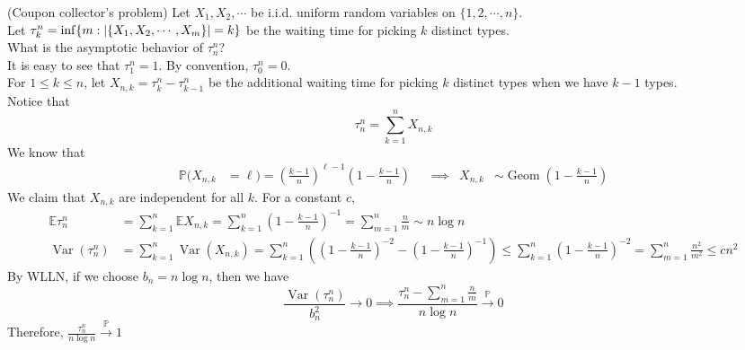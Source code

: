 \documentclass{huhtakm-template-book}
\newcommand{\prob}{\mathbb{P}}
\newcommand{\expect}{\mathbb{E}}
\DeclareMathOperator{\Geom}{Geom}
\DeclareMathOperator{\Var}{Var}
\begin{document}
\newpage
\begin{eg}(Coupon collector's problem) 
	Let $X_{1},X_{2},\cdots$ be i.i.d. uniform random variables on $\{1,2,\cdots,n\}$.\\
	Let $\tau_{k}^{n}=\inf\{m:\left|{\{X_{1},X_{2},\cdots,X_{m}\}}\right|=k\}$ be the waiting time for picking $k$ distinct types.\\
	What is the asymptotic behavior of $\tau_{n}^{n}$?\\
	It is easy to see that $\tau_{1}^{n}=1$. By convention, $\tau_{0}^{n}=0$.\\
	For $1\leq k\leq n$, let $X_{n,k}=\tau_{k}^{n}-\tau_{k-1}^{n}$ be the additional waiting time for picking $k$ distinct types when we have $k-1$ types.\\
	Notice that
	\begin{equation*}
		\tau_{n}^{n}=\sum_{k=1}^{n}X_{n,k}
	\end{equation*}
	We know that
	\begin{align*}
		\prob(X_{n,k}&=\ell)=\left(\frac{k-1}{n}\right)^{\ell-1}\left(1-\frac{k-1}{n}\right) & &\implies & X_{n,k}&\sim\Geom\left(1-\frac{k-1}{n}\right)
	\end{align*}
	We claim that $X_{n,k}$ are independent for all $k$. For a constant $c$,
	\begin{align*}
		\expect\tau_{n}^{n}&=\sum_{k=1}^{n}\expect X_{n,k}=\sum_{k=1}^{n}\left(1-\frac{k-1}{n}\right)^{-1}=\sum_{m=1}^{n}\frac{n}{m}\sim n\log n\\
		\Var(\tau_{n}^{n})&=\sum_{k=1}^{n}\Var(X_{n,k})=\sum_{k=1}^{n}\left(\left(1-\frac{k-1}{n}\right)^{-2}-\left(1-\frac{k-1}{n}\right)^{-1}\right)\leq\sum_{k=1}^{n}\left(1-\frac{k-1}{n}\right)^{-2}=\sum_{m=1}^{n}\frac{n^{2}}{m^{2}}\leq cn^{2}
	\end{align*}
	By WLLN, if we choose $b_{n}=n\log n$, then we have
	\begin{equation*}
		\frac{\Var(\tau_{n}^{n})}{b_{n}^{2}}\to 0\implies\frac{\tau_{n}^{n}-\sum_{m=1}^{n}\frac{n}{m}}{n\log n}\xrightarrow{\prob}0
	\end{equation*}
	Therefore, $\frac{\tau_{n}^{n}}{n\log n}\xrightarrow{\prob}1$
\end{eg}
\end{document}
